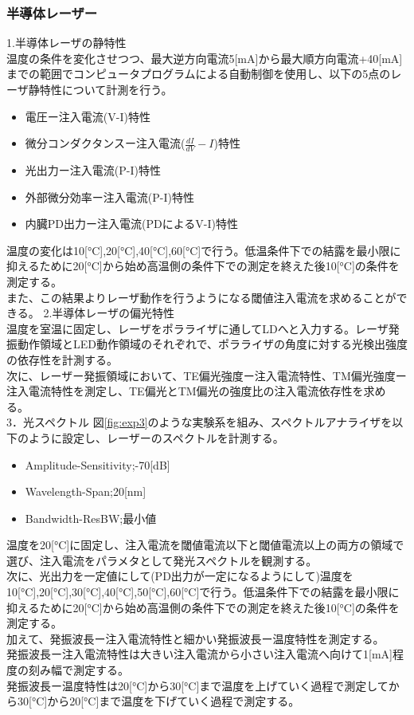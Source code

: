 \documentclass[titlepage]{jsarticle}
\begin{document}
\subsubsection{半導体レーザー}
1.半導体レーザの静特性\\
温度の条件を変化させつつ、最大逆方向電流5[mA]から最大順方向電流+40[mA]までの範囲でコンピュータプログラムによる自動制御を使用し、以下の5点のレーザ静特性について計測を行う。
\begin{itemize}
    \item 電圧ー注入電流(V-I)特性
    \item 微分コンダクタンスー注入電流($\frac{dI}{dV}-I$)特性
    \item 光出力ー注入電流(P-I)特性
    \item 外部微分効率ー注入電流(P-I)特性
    \item 内臓PD出力ー注入電流(PDによるV-I)特性
\end{itemize}
温度の変化は10[\si{\degreeCelsius}],20[\si{\degreeCelsius}],40[\si{\degreeCelsius}],60[\si{\degreeCelsius}]で行う。低温条件下での結露を最小限に抑えるために20[\si{\degreeCelsius}]から始め高温側の条件下での測定を終えた後10[\si{\degreeCelsius}]の条件を測定する。\\
また、この結果よりレーザ動作を行うようになる閾値注入電流を求めることができる。
2.半導体レーザの偏光特性\\
温度を室温に固定し、レーザをポラライザに通してLDへと入力する。レーザ発振動作領域とLED動作領域のそれぞれで、ポラライザの角度に対する光検出強度の依存性を計測する。\\
次に、レーザー発振領域において、TE偏光強度ー注入電流特性、TM偏光強度ー注入電流特性を測定し、TE偏光とTM偏光の強度比の注入電流依存性を求める。\\
3．光スペクトル
図\ref{fig:exp3}のような実験系を組み、スペクトルアナライザを以下のように設定し、レーザーのスペクトルを計測する。
\begin{itemize}
    \item Amplitude-Sensitivity;-70[\si{dB}]
    \item Wavelength-Span;20[\si{nm}]
    \item Bandwidth-ResBW;最小値
\end{itemize}
温度を20[\si{\degreeCelsius}]に固定し、注入電流を閾値電流以下と閾値電流以上の両方の領域で選び、注入電流をパラメタとして発光スペクトルを観測する。\\
次に、光出力を一定値にして(PD出力が一定になるようにして)温度を10[\si{\degreeCelsius}],20[\si{\degreeCelsius}],30[\si{\degreeCelsius}],40[\si{\degreeCelsius}],50[\si{\degreeCelsius}],60[\si{\degreeCelsius}]で行う。低温条件下での結露を最小限に抑えるために20[\si{\degreeCelsius}]から始め高温側の条件下での測定を終えた後10[\si{\degreeCelsius}]の条件を測定する。\\
加えて、発振波長ー注入電流特性と細かい発振波長ー温度特性を測定する。\\
発振波長ー注入電流特性は大きい注入電流から小さい注入電流へ向けて1[\si{mA}]程度の刻み幅で測定する。\\
発振波長ー温度特性は20[\si{\degreeCelsius}]から30[\si{\degreeCelsius}]まで温度を上げていく過程で測定してから30[\si{\degreeCelsius}]から20[\si{\degreeCelsius}]まで温度を下げていく過程で測定する。
\end{document}

